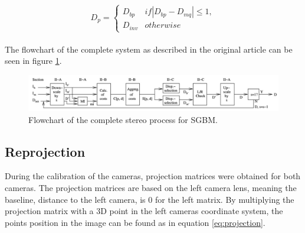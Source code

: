
\begin{equation} \label{eq:consistency}
D_{p} =
\left\{\begin{matrix}
D_{bp}	&  if|D_{bp} - D_{mq}| \leq 1, \\
D_{inv} & otherwise
\end{matrix}\right.
\end{equation}\\ 


The flowchart of the complete system as described in the original article \cite{Hirschmuller2008} can be seen in figure \ref{fig:complete_system}.


\begin{figure}[h!]
  \centering
    \includegraphics[width=\textwidth]{graphics/06_vision/complete_system.jpg}
     \caption{ Flowchart of the complete stereo process for SGBM. } 
    \label{fig:complete_system}
\end{figure}


\subsection{Reprojection} \label{sec:reprojection}

During the calibration of the cameras, projection matrices were obtained for both cameras. The projection matrices are based on the left camera lens, meaning the baseline, distance to the left camera, is 0 for the left matrix. By multiplying the projection matrix with a 3D point in the left cameras coordinate system, the points position in the image can be found as in equation \ref{eq:projection}. 


